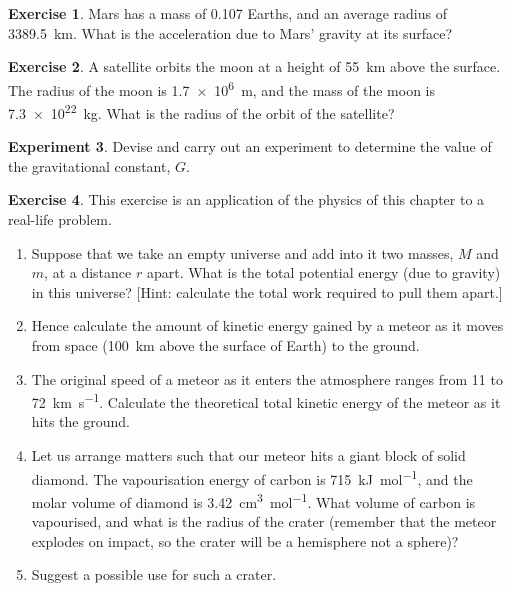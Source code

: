 \documentclass[a4paper]{amsbook}
\theoremstyle{definition}
\newtheorem{exercise}{Exercise}
\numberwithin{exercise}{chapter}
\numberwithin{exercise}{chapter}
\newtheorem{experiment}[exercise]{Experiment}
\begin{document}
\begin{exercise}
  Mars has a mass of 0.107 Earths, and an average radius of \SI{3389.5}{\kilo\metre}. What is the acceleration due to Mars' gravity
  at its surface?
\end{exercise}

\begin{exercise}
  A satellite orbits the moon at a height of \SI{55}{\kilo\metre} above the surface. The radius of the moon is \SI{1.7e6}{\metre}, and the
  mass of the moon is \SI{7.3e22}{\kilo\gram}. What is the radius of the orbit of the satellite?
\end{exercise}

\begin{experiment}
  Devise and carry out an experiment to determine the value of the gravitational constant, $ G $.
\end{experiment}

\begin{exercise}
  This exercise is an application of the physics of this chapter to a real-life problem.

  \begin{enumerate}
    \item Suppose that we take an empty universe and add into it two masses, $ M $ and $ m $, at a distance $ r $ apart. What is the total
            potential energy (due to gravity) in this universe? [Hint: calculate the total work required to pull them apart.]
    \item Hence calculate the amount of kinetic energy gained by a meteor as it moves from space (\SI{100}{\kilo\metre} above the surface of Earth)
            to the ground.
    \item The original speed of a meteor as it enters the atmosphere ranges from \num{11} to \SI{72}{\kilo\metre\per\second}. Calculate the theoretical
            total kinetic energy of the meteor as it hits the ground.
    \item Let us arrange matters such that our meteor hits a giant block of solid diamond. The vapourisation energy of carbon
            is \SI{715}{\kilo\joule\per\mole}, and the molar volume of diamond is \SI{3.42}{\centi\metre\cubed\per\mole}. What
            volume of carbon is vapourised, and what is the radius of the crater (remember that the meteor explodes on impact, so the
            crater will be a hemisphere not a sphere)?
    \item Suggest a possible use for such a crater.
  \end{enumerate}
\end{exercise}
\end{document}
